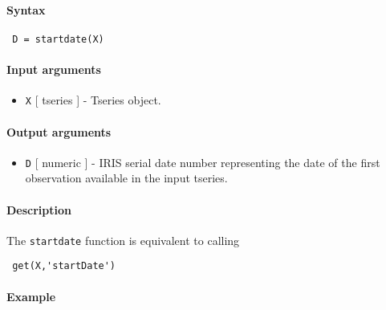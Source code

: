


	\paragraph{Syntax}
 
 \begin{verbatim}
 D = startdate(X)
 \end{verbatim}
 
 \paragraph{Input arguments}
 
 \begin{itemize}
 \item
   \texttt{X} {[} tseries {]} - Tseries object.
 \end{itemize}
 
 \paragraph{Output arguments}
 
 \begin{itemize}
 \item
   \texttt{D} {[} numeric {]} - IRIS serial date number representing the
   date of the first observation available in the input tseries.
 \end{itemize}
 
 \paragraph{Description}
 
 The \texttt{startdate} function is equivalent to calling
 
 \begin{verbatim}
 get(X,'startDate')
 \end{verbatim}
 
 \paragraph{Example}


